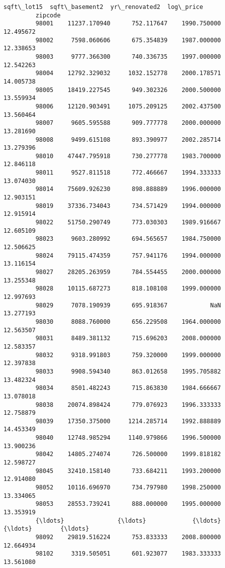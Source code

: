 \documentclass[11pt]{article}
\begin{document}
\begin{Verbatim}[commandchars=\\\{\}]
                    sqft\_lot15  sqft\_basement2  yr\_renovated2  log\_price  
         zipcode                                                          
         98001    11237.170940      752.117647    1990.750000  12.495672  
         98002     7598.060606      675.354839    1987.000000  12.338653  
         98003     9777.366300      740.336735    1997.000000  12.542263  
         98004    12792.329032     1032.152778    2000.178571  14.005738  
         98005    18419.227545      949.302326    2000.500000  13.559934  
         98006    12120.903491     1075.209125    2002.437500  13.560464  
         98007     9605.595588      909.777778    2000.000000  13.281690  
         98008     9499.615108      893.390977    2002.285714  13.279396  
         98010    47447.795918      730.277778    1983.700000  12.846118  
         98011     9527.811518      772.466667    1994.333333  13.074030  
         98014    75609.926230      898.888889    1996.000000  12.903151  
         98019    37336.734043      734.571429    1994.000000  12.915914  
         98022    51750.290749      773.030303    1989.916667  12.605109  
         98023     9603.280992      694.565657    1984.750000  12.506625  
         98024    79115.474359      757.941176    1994.000000  13.116154  
         98027    28205.263959      784.554455    2000.000000  13.255348  
         98028    10115.687273      818.108108    1999.000000  12.997693  
         98029     7078.190939      695.918367            NaN  13.277193  
         98030     8088.760000      656.229508    1964.000000  12.563507  
         98031     8489.381132      715.696203    2008.000000  12.583357  
         98032     9318.991803      759.320000    1999.000000  12.397838  
         98033     9908.594340      863.012658    1995.705882  13.482324  
         98034     8501.482243      715.863830    1984.666667  13.078018  
         98038    20074.898424      779.076923    1996.333333  12.758879  
         98039    17350.375000     1214.285714    1992.888889  14.453349  
         98040    12748.985294     1140.979866    1996.500000  13.900236  
         98042    14805.274074      726.500000    1999.818182  12.598727  
         98045    32410.158140      733.684211    1993.200000  12.914080  
         98052    10116.696970      734.797980    1998.250000  13.334065  
         98053    28553.739241      888.000000    1995.000000  13.353919  
         {\ldots}               {\ldots}             {\ldots}            {\ldots}        {\ldots}  
         98092    29819.516224      753.833333    2008.800000  12.664934  
         98102     3319.505051      601.923077    1983.333333  13.561080  

\end{Verbatim}
\end{document}
